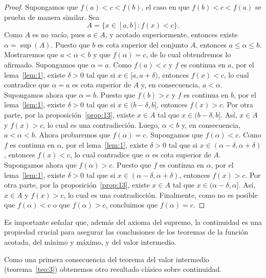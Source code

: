 \documentclass[12pt,a4paper]{book}
\begin{document}
    \begin{proof}
        Supongamos que $f(a)<c<f(b)$, el caso en que $f(b)<c<
        f(a)$ se prueba de manera similar. Sea
        \begin{equation*}
            A=\{x\in[a,b]:f(x)<c\}.
        \end{equation*}
        Como $A$ es no vacío, pues $a\in A$, y acotado superiormente, entonces existe
        $\alpha=\sup(A)$. Puesto que $b$ es cota superior del conjunto $A$, entonces $a\leq
        \alpha\leq b$. Mostraremos que $a<\alpha<b$ y que $f(\alpha)=c$, de lo cual obtendremos
        lo afirmado. Supongamos que $\alpha=a$. Como $f(a)<c$ y $f$ es continua en $a$,
        por el lema~\ref{lem:1}, existe $\delta>0$ tal que si $x\in[a,a+\delta)$, entonces $f(x)<c$, lo
        cual contradice que $\alpha=a$ es cota superior de $A$ y, en consecuencia, $a<\alpha$.
        Supongamos ahora que $\alpha=b$. Puesto que $f(b)>c$ y $f$ es continua en $b$,
        por el lema~\ref{lem:1}, existe $\delta>0$ tal que si $x\in(b-\delta,b]$, entonces $f(x)>c$.
        Por otra parte, por la proposición~\ref{prop:13}, existe $x\in A$ tal que $x\in(b-\delta,b]$.
        Así, $x\in A$ y $f(x)>c$, lo cual es una contradicción. Luego, $\alpha<b$ y, en
        consecuencia, $a<\alpha<b$. Ahora probaremos que $f(\alpha)=c$. Supongamos que
        $f(\alpha)<c$. Como $f$ es continua en $\alpha$, por el lema~\ref{lem:1}, existe $\delta>0$ tal que
        si $x\in(\alpha-\delta,\alpha+\delta)$, entonces $f(x)<c$, lo cual contradice que $\alpha$ es cota
        superior de $A$. Supongamos ahora que $f(\alpha)>c$. Puesto que $f$ es continua en
        $\alpha$, por el lema~\ref{lem:1}, existe $\delta>0$ tal que si $x\in(\alpha-\delta,\alpha+\delta)$, entonces $f(x)>c$.
        Por otra parte, por la proposición~\ref{prop:13}, existe $x\in A$ tal que $x\in(\alpha-\delta,\alpha]$.
        Así, $x\in A$ y $f(x)>c$, lo cual es una contradicción. Finalmente, como no es
        posible que $f(\alpha)<c$ o que $f(\alpha)>c$, concluimos que $f(\alpha)=c$.
    \end{proof}

    Es importante señalar que, además del axioma del supremo, la continuidad
    es una propiedad crucial para asegurar las conclusiones de los teoremas de la
    función acotada, del mínimo y máximo, y del valor intermedio.

    Como una primera consecuencia del teorema del valor intermedio (teorema~\ref{teo:3})
    obtenemos otro resultado clásico sobre continuidad.
\end{document}
